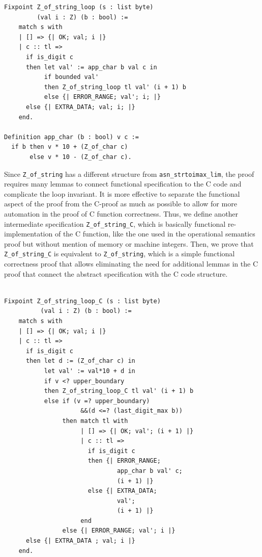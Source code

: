 \documentclass[10p,conference]{IEEEtran}
\begin{document}
 \begin{lstlisting}[language=Coq]
Fixpoint Z_of_string_loop (s : list byte) 
         (val i : Z) (b : bool) := 
    match s with 
    | [] => {| OK; val; i |}
    | c :: tl => 
      if is_digit c
      then let val' := app_char b val c in 
           if bounded val'
           then Z_of_string_loop tl val' (i + 1) b
           else {| ERROR_RANGE; val'; i; |}      
      else {| EXTRA_DATA; val; i; |}              
    end.

Definition app_char (b : bool) v c := 
  if b then v * 10 + (Z_of_char c) 
       else v * 10 - (Z_of_char c).
 \end{lstlisting}

 Since \texttt{Z\_of\_string} has a different structure from
 \texttt{asn\_strtoimax\_lim}, the proof requires many lemmas to
 connect functional specification to the C code and complicate the loop
 invariant. It is more effective to separate the
 functional aspect of the proof from the C-proof as much as possible to
 allow for more automation in the proof of C function
 correctness. Thus, we define another intermediate specification
 \texttt{Z\_of\_string\_C}, which is basically functional
 re-implementation of the C function, like the one used in the
 operational semantics proof but without mention of memory or machine integers. Then,
 we prove that \texttt{Z\_of\_string\_C} is equivalent to
 \texttt{Z\_of\_string}, which is a simple functional correctness
 proof that allows eliminating the need for additional lemmas in the
 C proof that connect the abstract specification with the C code structure.

 \begin{lstlisting}[language=Coq]
 
Fixpoint Z_of_string_loop_C (s : list byte)
          (val i : Z) (b : bool) := 
    match s with 
    | [] => {| OK; val; i |}
    | c :: tl => 
      if is_digit c
      then let d := (Z_of_char c) in 
           let val' := val*10 + d in
           if v <? upper_boundary 
           then Z_of_string_loop_C tl val' (i + 1) b
           else if (v =? upper_boundary)
                     &&(d <=? (last_digit_max b))
                then match tl with
                     | [] => {| OK; val'; (i + 1) |}
                     | c :: tl => 
                       if is_digit c
                       then {| ERROR_RANGE; 
                               app_char b val' c; 
                               (i + 1) |}
                       else {| EXTRA_DATA; 
                               val'; 
                               (i + 1) |}
                     end
                else {| ERROR_RANGE; val'; i |}      
      else {| EXTRA_DATA ; val; i |}              
    end.
    
 \end{lstlisting}
\end{document}
